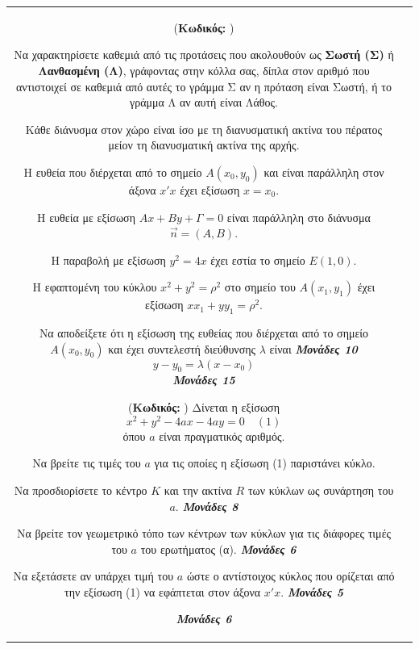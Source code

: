 \documentclass[11pt,a4paper,twoside]{book}
\newcounter{askhsh}[chapter]
\renewcommand{\theaskhsh}{
	\bf{\titlefont{\Large{\thechapter}}.\arabic{askhsh}}
}
\newcommand{\Askhsh}[2]{\refstepcounter{askhsh}{\vspace{4mm}\titlefont{{\large Άσκηση}\theaskhsh} - \textcolor{maincolor}{ΘEMA #2}} ({\small{\textbf{Κωδικός:} #1}})}{}
\newcommand{\monades}[1]{
\hspace*{\fill}
\textbf{\textit{\textcolor{maincolor}{Μονάδες #1}}}}
\begin{document}
\begin{tabular}{cc}
\vspace{4mm}

\Askhsh{}{1}

\begin{alist}    \item  Να χαρακτηρίσετε καθεμιά από τις προτάσεις που ακολουθούν ως \textbf{Σωστή (Σ)} ή \textbf{Λανθασμένη (Λ)}, γράφοντας στην κόλλα σας, δίπλα στον αριθμό που αντιστοιχεί σε καθεμιά από αυτές το γράμμα Σ αν η πρόταση είναι Σωστή, ή το γράμμα Λ αν αυτή είναι Λάθος.
    \begin{rlist}
        \item Κάθε διάνυσμα στον χώρο είναι ίσο με τη διανυσματική ακτίνα του πέρατος μείον τη διανυσματική ακτίνα της αρχής.
        \item Η ευθεία που διέρχεται από το σημείο $A(x_0,y_0)$ και είναι παράλληλη στον άξονα $x'x$ έχει εξίσωση $x = x_0$.
        \item Η ευθεία με εξίσωση $Ax + By + \Gamma = 0$ είναι παράλληλη στο διάνυσμα $\vec{n} = (A,B)$.
        \item Η παραβολή με εξίσωση $y^2 = 4x$ έχει εστία το σημείο $E(1,0)$.
        \item Η εφαπτομένη του κύκλου $x^2 + y^2 = \rho^2$ στο σημείο του $A(x_1,y_1)$ έχει εξίσωση $x x_1 + y y_1 = \rho^2$.
    \end{rlist}
    \item Να αποδείξετε ότι η εξίσωση της ευθείας που διέρχεται από το σημείο $A(x_0,y_0)$ και έχει συντελεστή διεύθυνσης $\lambda$ είναι  \monades{10}
 \[ y - y_0 = \lambda (x - x_0) \] \monades{15}\end{alist}

\vspace{4mm}

\Askhsh{}{4}
Δίνεται η εξίσωση
\[ x^2 + y^2 - 4ax - 4ay = 0 \quad (1) \]
όπου $a$ είναι πραγματικός αριθμός.

\begin{alist}    \item Να βρείτε τις τιμές του $a$ για τις οποίες η εξίσωση (1) παριστάνει κύκλο.
    \item Να προσδιορίσετε το κέντρο $K$ και την ακτίνα $R$ των κύκλων ως συνάρτηση του $a$.  \monades{8}
    \item Να βρείτε τον γεωμετρικό τόπο των κέντρων των κύκλων για τις διάφορες τιμές του $a$ του ερωτήματος (α).  \monades{6}
    \item Να εξετάσετε αν υπάρχει τιμή του $a$ ώστε ο αντίστοιχος κύκλος που ορίζεται από την εξίσωση (1) να εφάπτεται στον άξονα $x'x$.  \monades{5}
 \monades{6}\end{alist}


\end{tabular}
\end{document}
